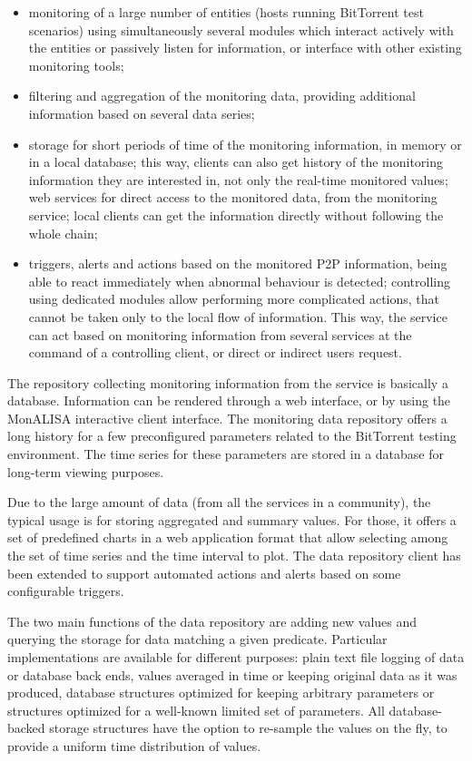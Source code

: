 \begin{itemize}
  \item monitoring of a large number of entities (hosts running BitTorrent
  test scenarios) using simultaneously several modules which interact actively
  with the entities or passively listen for information, or interface with
  other existing monitoring tools;
  \item filtering and aggregation of the monitoring data, providing additional
  information based on several data series;
  \item storage for short periods of time of the monitoring information, in
  memory or in a local database; this way, clients can also get history of
  the monitoring information they are interested in, not only the real-time
  monitored values; web services for direct access to the monitored data, from
  the monitoring service; local clients can get the information directly
  without following the whole chain;
  \item triggers, alerts and actions based on the monitored P2P information,
  being able to react immediately when abnormal behaviour is detected;
  controlling using dedicated modules allow performing more complicated
  actions, that cannot be taken only to the local flow of information. This
  way, the service can act based on monitoring information from several
  services at the command of a controlling client, or direct or indirect users
  request.
\end{itemize}

The repository collecting monitoring information from the service is basically
a database. Information can be rendered through a web interface, or by using
the MonALISA interactive client interface. The monitoring data repository
offers a long history for a few preconfigured parameters related to the
BitTorrent testing environment. The time series for these parameters are
stored in a database for long-term viewing purposes.

Due to the large amount of data (from all the services in a community), the
typical usage is for storing aggregated and summary values. For those, it
offers a set of predefined charts in a web application format that allow
selecting among the set of time series and the time interval to plot. The data
repository client has been extended to support automated actions and alerts
based on some configurable triggers.

The two main functions of the data repository are adding new values and
querying the storage for data matching a given predicate. Particular
implementations are available for different purposes: plain text file logging
of data or database back ends, values averaged in time or keeping original data
as it was produced, database structures optimized for keeping arbitrary
parameters or structures optimized for a well-known limited set of parameters.
All database-backed storage structures have the option to re-sample the values
on the fly, to provide a uniform time distribution of values.

